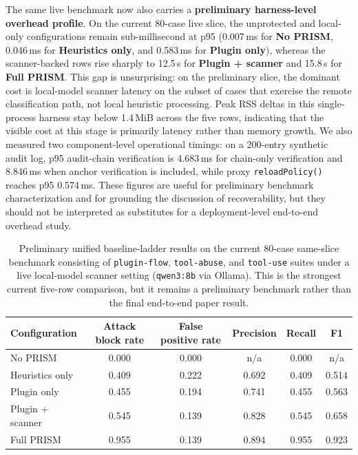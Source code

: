The same live benchmark now also carries a \textbf{preliminary harness-level overhead profile}. On the current 80-case live slice, the unprotected and local-only configurations remain sub-millisecond at p95 (0.007\,ms for \textbf{No PRISM}, 0.046\,ms for \textbf{Heuristics only}, and 0.583\,ms for \textbf{Plugin only}), whereas the scanner-backed rows rise sharply to 12.5\,s for \textbf{Plugin + scanner} and 15.8\,s for \textbf{Full PRISM}. This gap is unsurprising: on the preliminary slice, the dominant cost is local-model scanner latency on the subset of cases that exercise the remote classification path, not local heuristic processing. Peak RSS deltas in this single-process harness stay below 1.4\,MiB across the five rows, indicating that the visible cost at this stage is primarily latency rather than memory growth. We also measured two component-level operational timings: on a 200-entry synthetic audit log, p95 audit-chain verification is 4.683\,ms for chain-only verification and 8.846\,ms when anchor verification is included, while proxy \texttt{reloadPolicy()} reaches p95 0.574\,ms. These figures are useful for preliminary benchmark characterization and for grounding the discussion of recoverability, but they should not be interpreted as substitutes for a deployment-level end-to-end overhead study.

\begin{table}[t]
\centering
\footnotesize
\begin{tabularx}{\textwidth}{l c c c c c}
\toprule
Configuration & Attack block rate & False positive rate & Precision & Recall & F1 \\
\midrule
No PRISM & 0.000 & 0.000 & n/a & 0.000 & n/a \\
Heuristics only & 0.409 & 0.222 & 0.692 & 0.409 & 0.514 \\
Plugin only & 0.455 & 0.194 & 0.741 & 0.455 & 0.563 \\
Plugin + scanner & 0.545 & 0.139 & 0.828 & 0.545 & 0.658 \\
Full PRISM & 0.955 & 0.139 & 0.894 & 0.955 & 0.923 \\
\bottomrule
\end{tabularx}
\caption{Preliminary unified baseline-ladder results on the current 80-case same-slice benchmark consisting of \texttt{plugin-flow}, \texttt{tool-abuse}, and \texttt{tool-use} suites under a live local-model scanner setting (\texttt{qwen3:8b} via Ollama). This is the strongest current five-row comparison, but it remains a preliminary benchmark rather than the final end-to-end paper result.}
\label{tab:prelim-baseline-ladder}
\end{table}

